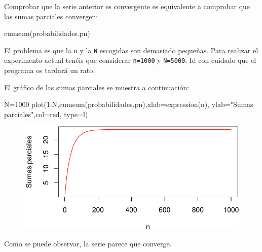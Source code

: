 \documentclass[
  letterpaper,
  DIV=11,
  numbers=noendperiod]{scrreprt}
\newenvironment{Shaded}{\begin{snugshade}}{\end{snugshade}}
\newcommand{\AttributeTok}[1]{\textcolor[rgb]{0.40,0.45,0.13}{#1}}
\newcommand{\DecValTok}[1]{\textcolor[rgb]{0.68,0.00,0.00}{#1}}
\newcommand{\FunctionTok}[1]{\textcolor[rgb]{0.28,0.35,0.67}{#1}}
\newcommand{\NormalTok}[1]{\textcolor[rgb]{0.00,0.23,0.31}{#1}}
\newcommand{\OtherTok}[1]{\textcolor[rgb]{0.00,0.23,0.31}{#1}}
\newcommand{\SpecialCharTok}[1]{\textcolor[rgb]{0.37,0.37,0.37}{#1}}
\newcommand{\StringTok}[1]{\textcolor[rgb]{0.13,0.47,0.30}{#1}}
\begin{document}
Comprobar que la serie anterior es convergente es equivalente a
comprobar que las sumas parciales convergen:

\begin{Shaded}
\begin{Highlighting}[]
\FunctionTok{cumsum}\NormalTok{(probabilidades.pn)}
\end{Highlighting}
\end{Shaded}

El problema es que la \texttt{n} y la \texttt{N} escogidas son demasiado
pequeñas. Para realizar el experimento actual tenéis que considerar
\texttt{n=1000} y \texttt{N=5000}. Id con cuidado que el programa os
tardará un rato.

El gráfico de las sumas parciales se muestra a continuación:

\begin{Shaded}
\begin{Highlighting}[]
\NormalTok{N}\OtherTok{=}\DecValTok{1000}
\FunctionTok{plot}\NormalTok{(}\DecValTok{1}\SpecialCharTok{:}\NormalTok{N,}\FunctionTok{cumsum}\NormalTok{(probabilidades.pn),}\AttributeTok{xlab=}\FunctionTok{expression}\NormalTok{(n),}
     \AttributeTok{ylab=}\StringTok{"Sumas parciales"}\NormalTok{,}\AttributeTok{col=}\StringTok{\textquotesingle{}red\textquotesingle{}}\NormalTok{, }\AttributeTok{type=}\StringTok{\textquotesingle{}l\textquotesingle{}}\NormalTok{)}
\end{Highlighting}
\end{Shaded}

\begin{figure}[H]

{\centering \includegraphics{7_files/figure-pdf/unnamed-chunk-9-1.pdf}

}

\end{figure}

Como se puede observar, la serie parece que converge.
\end{document}
